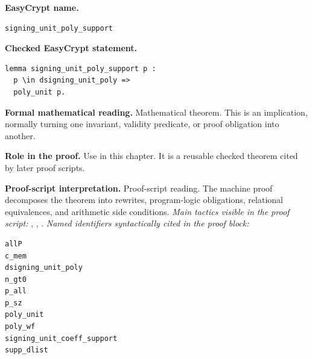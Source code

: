 \begin{formaltheorem}
\noindent\textbf{EasyCrypt name.}
\begin{lstlisting}[language=EasyCrypt,basicstyle=\ttfamily\scriptsize]
signing_unit_poly_support
\end{lstlisting}
\noindent\textbf{Checked EasyCrypt statement.}
\begin{lstlisting}[language=EasyCrypt,basicstyle=\ttfamily\scriptsize]
lemma signing_unit_poly_support p :
  p \in dsigning_unit_poly =>
  poly_unit p.
\end{lstlisting}
\noindent\textbf{Formal mathematical reading.}
Mathematical theorem. This is an implication, normally turning one invariant, validity predicate, or proof obligation into another.

\noindent\textbf{Role in the proof.}
Use in this chapter. It is a reusable checked theorem cited by later proof scripts.

\noindent\textbf{Proof-script interpretation.}
Proof-script reading. The machine proof decomposes the theorem into rewrites, program-logic obligations, relational equivalences, and arithmetic side conditions.
\emph{Main tactics visible in the proof script:} , , .
\emph{Named identifiers syntactically cited in the proof block:}
\begin{lstlisting}[language=EasyCrypt,basicstyle=\ttfamily\scriptsize]
allP
c_mem
dsigning_unit_poly
n_gt0
p_all
p_sz
poly_unit
poly_wf
signing_unit_coeff_support
supp_dlist
\end{lstlisting}

\end{formaltheorem}


